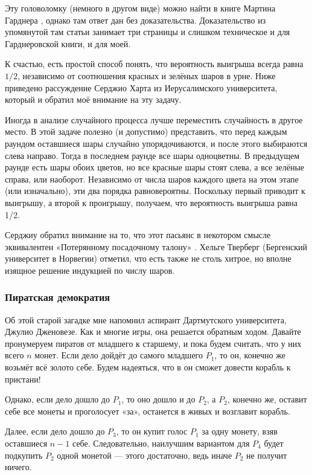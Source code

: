 Эту головоломку (немного в другом виде) можно найти в книге Мартина Гарднера \cite[2.16]{30}, однако там ответ дан без доказательства.
Доказательство из упомянутой там статьи \cite{45} занимает три страницы и слишком техническое и для Гарднеровской книги, и для моей.

К счастью, есть простой способ понять, что вероятность выигрыша всегда равна $1/2$, независимо от соотношения красных и зелёных шаров в урне.
Ниже приведено рассуждение Серджио Харта из Иерусалимского университета, который и обратил моё внимание на эту задачу.

Иногда в анализе случайного процесса лучше переместить случайность в другое место.
В этой задаче полезно (и допустимо) представить, что перед каждым раундом оставшиеся шары случайно упорядочиваются, и после этого выбираются слева направо.
Тогда в последнем раунде все шары одноцветны.
В предыдущем раунде есть шары обоих цветов, но все красные шары стоят слева, а все зелёные справа, или наоборот.
Независимо от числа шаров каждого цвета на этом этапе (или изначально), эти два порядка равновероятны.
Поскольку первый приводит к выигрышу, а второй к проигрышу, получаем, что вероятность выигрыша равна 1/2.

Серджиу обратил внимание на то, что этот пасьянс в некотором смысле эквивалентен «Потерянному посадочному талону» \cite[стр. 42]{59}.
Хельге Тверберг (Бергенский университет в Норвегии) отметил, что есть также не столь хитрое, но вполне изящное решение индукцией по числу шаров.

\subsubsection*{Пиратская демократия}

Об этой старой загадке мне напомнил аспирант Дартмутского университета, Джулио Дженовезе.
Как и многие игры, она решается обратным ходом.
Давайте пронумеруем пиратов от младшего к старшему, и пока будем считать, что у них всего $n$ монет.
Если дело дойдёт до самого младшего $P_1$, то он, конечно же возьмёт всё золото себе.
Будем надеяться, что в он сможет довести корабль к пристани!

Однако, если дело дошло до $P_1$, то оно дошло и до $P_2$, а
$P_2$, конечно же, оставит себе все монеты и проголосует «за», останется в живых и возглавит корабль.

Далее, если дело дошло до $P_3$, то он купит голос $P_1$ за одну монету, взяв оставшиеся $n - 1$ себе.
Следовательно, наилучшим вариантом для $P_4$ будет подкупить $P_2$ одной монетой ---
этого достаточно, ведь иначе $P_2$ не получит ничего.

